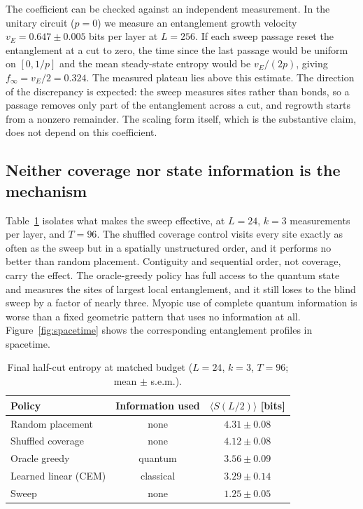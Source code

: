 \documentclass[aps,prb,twocolumn,superscriptaddress,nofootinbib]{revtex4-2}
\begin{document}
The coefficient can be checked against an independent measurement. In the
unitary circuit ($p = 0$) we measure an entanglement growth velocity
$v_E = 0.647 \pm 0.005$ bits per layer at $L = 256$. If each sweep passage
reset the entanglement at a cut to zero, the time since the last passage
would be uniform on $[0, 1/p]$ and the mean steady-state entropy would be
$v_E/(2p)$, giving $f_\infty = v_E/2 = 0.324$. The measured plateau lies
above this estimate. The direction of the discrepancy is expected: the
sweep measures sites rather than bonds, so a passage removes only part of
the entanglement across a cut, and regrowth starts from a nonzero
remainder. The scaling form itself, which is the substantive claim, does
not depend on this coefficient.

\subsection{Neither coverage nor state information is the mechanism}
\label{sec:coverage}
Table~\ref{tab:policies} isolates what makes the sweep effective, at
$L = 24$, $k = 3$ measurements per layer, and $T = 96$. The shuffled
coverage control visits every site exactly as often as the sweep but in a
spatially unstructured order, and it performs no better than random
placement. Contiguity and sequential order, not coverage, carry the
effect. The oracle-greedy policy has full access to the quantum state and
measures the sites of largest local entanglement, and it still loses to
the blind sweep by a factor of nearly three. Myopic use of complete
quantum information is worse than a fixed geometric pattern that uses no
information at all. Figure~\ref{fig:spacetime} shows the corresponding
entanglement profiles in spacetime.

\begin{table}
\caption{Final half-cut entropy at matched budget
($L = 24$, $k = 3$, $T = 96$; mean $\pm$ s.e.m.).}
\label{tab:policies}
\begin{ruledtabular}
\begin{tabular}{lcc}
Policy & Information used & $\langle S(L/2)\rangle$ [bits] \\
\hline
Random placement   & none      & $4.31 \pm 0.08$ \\
Shuffled coverage  & none      & $4.12 \pm 0.08$ \\
Oracle greedy      & quantum   & $3.56 \pm 0.09$ \\
Learned linear (CEM) & classical & $3.29 \pm 0.14$ \\
Sweep              & none      & $1.25 \pm 0.05$ \\
\end{tabular}
\end{ruledtabular}
\end{table}
\end{document}
